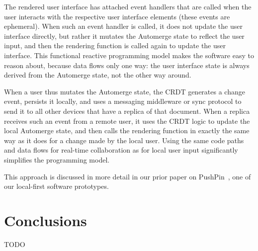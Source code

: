 \documentclass[sigconf]{acmart}
\begin{document}
The rendered user interface has attached event handlers that are called when the user interacts with the respective user interface elements (these events are ephemeral).
When such an event handler is called, it does not update the user interface directly, but rather it mutates the Automerge state to reflect the user input, and then the rendering function is called again to update the user interface.
This functional reactive programming model makes the software easy to reason about, because data flows only one way: the user interface state is always derived from the Automerge state, not the other way around.

When a user thus mutates the Automerge state, the CRDT generates a change event, persists it locally, and uses a messaging middleware or sync protocol to send it to all other devices that have a replica of that document.
When a replica receives such an event from a remote user, it uses the CRDT logic to update the local Automerge state, and then calls the rendering function in exactly the same way as it does for a change made by the local user.
Using the same code paths and data flows for real-time collaboration as for local user input significantly simplifies the programming model.

This approach is discussed in more detail in our prior paper on PushPin~\cite{vanHardenberg:2020}, one of our local-first software prototypes.

\section{Conclusions}

TODO


{}
\end{document}
